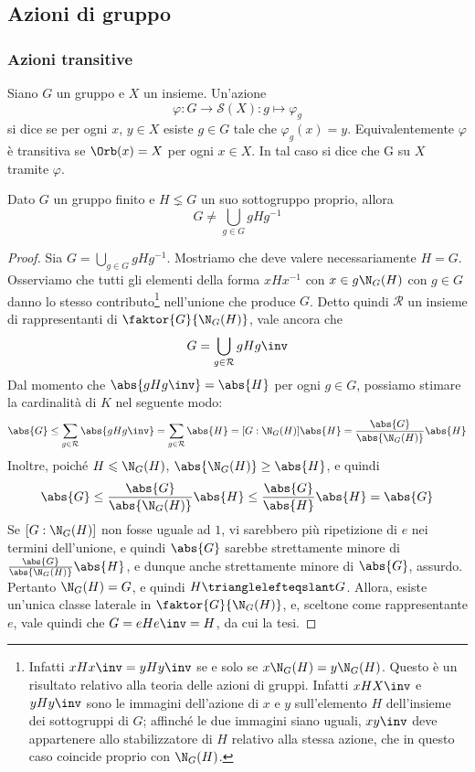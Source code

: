 \documentclass[11pt]{scrartcl}
\begin{document}
	\newpage
	
	\subsection{Azioni di gruppo}
	
	\subsubsection{Azioni transitive}
	
	\begin{definition}
		Siano $G$ un gruppo e $X$ un insieme. Un'azione \[
		\varphi:G\longrightarrow \mathcal{S}(X) :g \longmapsto \varphi_g
		\]si dice  se per ogni $x$, $y \in X$ esiste $g \in G$
		tale che $\varphi_g(x) = y$. Equivalentemente $\varphi$ è transitiva se
		$\Orb(x) = X$ per ogni 
		$x \in X$. In tal caso si dice che G  su $X$ 
		tramite $\varphi$.
	\end{definition}
	
	\begin{lemma}
		\label{lemma1.40}
		Dato $G$ un gruppo finito e $H \lneq G$ un suo sottogruppo proprio, allora \[
		G \neq \bigcup_{g \in G}gHg^{-1}
		\]
	\end{lemma}
	
	\begin{proof}
		Sia $G = \bigcup_{g \in G}gHg^{-1}$. Mostriamo che deve valere necessariamente
		$H = G$. Osserviamo che tutti gli
		elementi della forma $xHx^{-1}$ con $x \in g \N_G(H)$ con $g \in G$ danno
		lo stesso contributo\footnote{
			Infatti $xHx\inv = yHy\inv$ se e solo se $x \N_G(H) = y \N_G(H)$. Questo
			è un risultato relativo alla teoria delle azioni di gruppi. Infatti
			$xHX\inv$ e $yHy\inv$ sono le immagini dell'azione di $x$ e $y$ sull'elemento
			$H$ dell'insieme dei sottogruppi di $G$; affinché le due immagini siano uguali,
			$xy\inv$ deve appartenere allo stabilizzatore di $H$ relativo alla stessa
			azione, che in questo caso coincide proprio con $\N_G(H)$.
		} nell'unione che produce $G$. Detto quindi $\mathcal{R}$ un
		insieme di rappresentanti di $\faktor{G}{\N_G(H)}$, vale ancora che
		\[ G  = \bigcup_{g \in \mathcal{R}} gHg\inv \]
		Dal momento che $\abs{gHg\inv} = \abs{H}$ per ogni $g \in G$, possiamo
		stimare la cardinalità di $K$ nel seguente modo:
		\[ \abs{G} \leq \sum_{g \in \mathcal{R}} \abs{gHg\inv} = \sum_{g \in \mathcal{R}} \abs{H} = [G : \N_G(H)] \abs{H} = \frac{\abs{G}}{\abs{\N_G(H)}} \abs{H} \]
		Inoltre, poiché $H \leqslant \N_G(H)$, $\abs{\N_G(H)} \geq \abs{H}$, e quindi
		\[ \abs{G} \leq \frac{\abs{G}}{\abs{\N_G(H)}} \abs{H} \leq \frac{\abs{G}}{\abs{H}} \abs{H} = \abs{G} \]
		Se $[G : \N_G(H)]$ non fosse uguale ad $1$, vi sarebbero più ripetizione di $e$
		nei termini dell'unione, e quindi $\abs{G}$ sarebbe strettamente minore di
		$\frac{\abs{G}}{\abs{\N_G(H)}} \abs{H}$, e dunque anche strettamente minore
		di $\abs{G}$, assurdo. Pertanto
		$\N_G(H) = G$, e quindi $H \trianglelefteqslant G$. Allora, esiste un'unica
		classe laterale in $\faktor{G}{\N_G(H)}$, e, sceltone come rappresentante $e$,
		vale quindi che $G = eHe\inv = H$, da cui la tesi.
	\end{proof}
	
\end{document}
